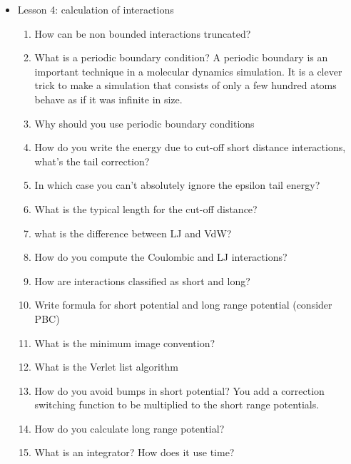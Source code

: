 {\begin{itemize}
\begin{enumerate}
        \item What is meant by separability when talking about the potential energy? and additivity?
        \item What is a multi-body potential? What type of truncation you can perform?
        \item What are the differences between VdW and Coulomb interactions?
        \item What is the difference between bonded and non-bonded interactions?
    \end{enumerate}    
    \item Lesson 4: calculation of interactions
    \begin{enumerate}
        \item How can be non bounded interactions truncated?
        \item What is a periodic boundary condition? A periodic boundary is an important technique in a molecular dynamics simulation. It is a clever trick to make a simulation that consists of only a few hundred atoms behave as if it was infinite in size.
        \item Why should you use periodic boundary conditions 
        \item How do you write the energy due to cut-off short distance interactions, what's the tail correction?
        \item In which case you can't absolutely ignore the epsilon tail energy?
        \item What is the typical length for the cut-off distance?
        \item what is the difference between LJ and VdW?
        \item How do you compute the Coulombic and LJ interactions?
        \item How are interactions classified as short and long?
        \item Write formula for short potential and long range potential (consider PBC)
        \item What is the minimum image convention?
        \item What is the Verlet list algorithm
        \item How do you avoid bumps in short potential? You add a correction switching function to be multiplied to the short range potentials.
        \item How do you calculate long range potential? %
        \item What is an integrator? How does it use time?

\end{enumerate}
\end{itemize}}
